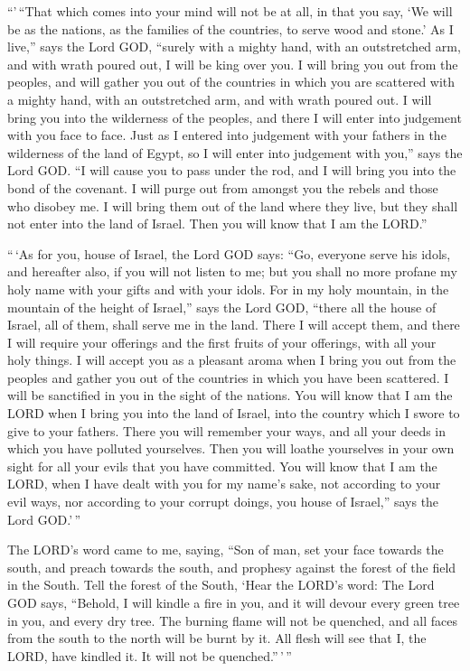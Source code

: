  ``'\,``That which comes into your mind will not be at
all, in that you say, `We will be as the nations, as the families of the
countries, to serve wood and stone.'  As I live,'' says
the Lord GOD, ``surely with a mighty hand, with an outstretched arm, and
with wrath poured out, I will be king over you.  I will
bring you out from the peoples, and will gather you out of the countries
in which you are scattered with a mighty hand, with an outstretched arm,
and with wrath poured out.  I will bring you into the
wilderness of the peoples, and there I will enter into judgement with
you face to face.  Just as I entered into judgement with
your fathers in the wilderness of the land of Egypt, so I will enter
into judgement with you,'' says the Lord GOD.  ``I will
cause you to pass under the rod, and I will bring you into the bond of
the covenant.  I will purge out from amongst you the
rebels and those who disobey me. I will bring them out of the land where
they live, but they shall not enter into the land of Israel. Then you
will know that I am the LORD.''

 ``\,`As for you, house of Israel, the Lord GOD says:
``Go, everyone serve his idols, and hereafter also, if you will not
listen to me; but you shall no more profane my holy name with your gifts
and with your idols.  For in my holy mountain, in the
mountain of the height of Israel,'' says the Lord GOD, ``there all the
house of Israel, all of them, shall serve me in the land. There I will
accept them, and there I will require your offerings and the first
fruits of your offerings, with all your holy things.  I
will accept you as a pleasant aroma when I bring you out from the
peoples and gather you out of the countries in which you have been
scattered. I will be sanctified in you in the sight of the nations.
 You will know that I am the LORD when I bring you into
the land of Israel, into the country which I swore to give to your
fathers.  There you will remember your ways, and all your
deeds in which you have polluted yourselves. Then you will loathe
yourselves in your own sight for all your evils that you have committed.
 You will know that I am the LORD, when I have dealt with
you for my name's sake, not according to your evil ways, nor according
to your corrupt doings, you house of Israel,'' says the Lord GOD.'\,''

 The LORD's word came to me, saying, 
``Son of man, set your face towards the south, and preach towards the
south, and prophesy against the forest of the field in the South.
 Tell the forest of the South, `Hear the LORD's word: The
Lord GOD says, ``Behold, I will kindle a fire in you, and it will devour
every green tree in you, and every dry tree. The burning flame will not
be quenched, and all faces from the south to the north will be burnt by
it.  All flesh will see that I, the LORD, have kindled
it. It will not be quenched.''\,'\,''

